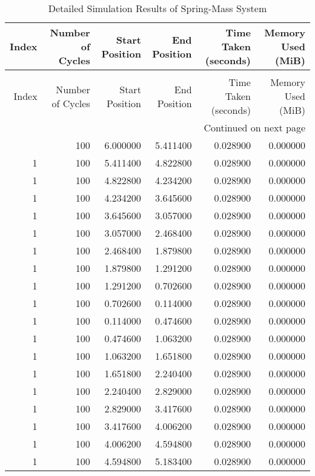 \begin{longtable}{rrrrrr}
\caption{Detailed Simulation Results of Spring-Mass System} \label{tab:spring_mass_detailed_results} \\
\toprule
Index & Number of Cycles & Start Position & End Position & Time Taken (seconds) & Memory Used (MiB) \\
\midrule
\endfirsthead
\caption[]{Detailed Simulation Results of Spring-Mass System} \\
\toprule
Index & Number of Cycles & Start Position & End Position & Time Taken (seconds) & Memory Used (MiB) \\
\midrule
\endhead
\midrule
\multicolumn{6}{r}{Continued on next page} \\
\midrule
\endfoot
\bottomrule
\endlastfoot
1 & 100 & 6.000000 & 5.411400 & 0.028900 & 0.000000 \\
1 & 100 & 5.411400 & 4.822800 & 0.028900 & 0.000000 \\
1 & 100 & 4.822800 & 4.234200 & 0.028900 & 0.000000 \\
1 & 100 & 4.234200 & 3.645600 & 0.028900 & 0.000000 \\
1 & 100 & 3.645600 & 3.057000 & 0.028900 & 0.000000 \\
1 & 100 & 3.057000 & 2.468400 & 0.028900 & 0.000000 \\
1 & 100 & 2.468400 & 1.879800 & 0.028900 & 0.000000 \\
1 & 100 & 1.879800 & 1.291200 & 0.028900 & 0.000000 \\
1 & 100 & 1.291200 & 0.702600 & 0.028900 & 0.000000 \\
1 & 100 & 0.702600 & 0.114000 & 0.028900 & 0.000000 \\
1 & 100 & 0.114000 & 0.474600 & 0.028900 & 0.000000 \\
1 & 100 & 0.474600 & 1.063200 & 0.028900 & 0.000000 \\
1 & 100 & 1.063200 & 1.651800 & 0.028900 & 0.000000 \\
1 & 100 & 1.651800 & 2.240400 & 0.028900 & 0.000000 \\
1 & 100 & 2.240400 & 2.829000 & 0.028900 & 0.000000 \\
1 & 100 & 2.829000 & 3.417600 & 0.028900 & 0.000000 \\
1 & 100 & 3.417600 & 4.006200 & 0.028900 & 0.000000 \\
1 & 100 & 4.006200 & 4.594800 & 0.028900 & 0.000000 \\
1 & 100 & 4.594800 & 5.183400 & 0.028900 & 0.000000 \\

\end{longtable}
